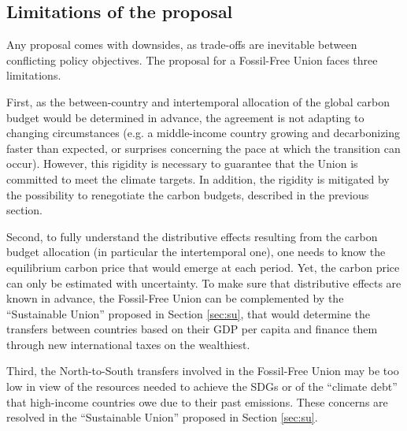 \documentclass[12pt,english]{article}
\begin{document}
\subsection{Limitations of the proposal\label{subsec:limitation}}

Any proposal comes with downsides, as trade-offs are inevitable between conflicting policy objectives. The proposal for a Fossil-Free Union faces three limitations. 

First, as the between-country and intertemporal allocation of the global carbon budget would be determined in advance, the agreement is not adapting to changing circumstances (e.g. a middle-income country growing and decarbonizing faster than expected, or surprises concerning the pace at which the transition can occur). However, this rigidity is necessary to guarantee that the Union is committed to meet the climate targets. In addition, the rigidity is mitigated by the possibility to renegotiate the carbon budgets, described in the previous section. 

Second, to fully understand the distributive effects resulting from the carbon budget allocation (in particular the intertemporal one), one needs to know the equilibrium carbon price that would emerge at each period. Yet, the carbon price can only be estimated with uncertainty. To make sure that distributive effects are known in advance, the Fossil-Free Union can be complemented by the ``Sustainable Union'' proposed in Section \ref{sec:su}, that would determine the transfers between countries based on their GDP per capita and finance them through new international taxes on the wealthiest.

Third, the North-to-South transfers involved in the Fossil-Free Union may be too low in view of the resources needed to achieve the SDGs or of the ``climate debt'' that high-income countries owe due to their past emissions. These concerns are resolved in the ``Sustainable Union'' proposed in Section \ref{sec:su}.



\end{document}
